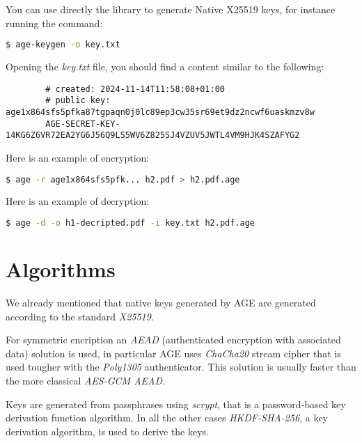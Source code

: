\documentclass{article}
\begin{document}
	\noindent You can use directly the library to generate Native X25519 keys, for instance running the command:
	\begin{lstlisting}[language=bash]
	$ age-keygen -o key.txt
	\end{lstlisting}
	
	\noindent Opening the \emph{key.txt} file, you should find a content similar to the following:
	\begin{small}
	\begin{verbatim}
		# created: 2024-11-14T11:58:08+01:00
		# public key: age1x864sfs5pfka87tgpaqn0j0lc89ep3cw35sr69et9dz2ncwf6uaskmzv8w
		AGE-SECRET-KEY-14KG6Z6VR72EA2YG6J56Q9LS5WV6Z825SJ4VZUV5JWTL4VM9HJK4SZAFYG2
	\end{verbatim}
	\end{small}
	
	\noindent Here is an example of encryption:
	\begin{small}
	\begin{lstlisting}[language=bash]
	$ age -r age1x864sfs5pfk... h2.pdf > h2.pdf.age
	\end{lstlisting}
	\end{small}
	
	\noindent Here is an example of decryption:
	\begin{small}
	\begin{lstlisting}[language=bash]
	$ age -d -o h1-decripted.pdf -i key.txt h2.pdf.age
	\end{lstlisting}
	\end{small}
	
	\section{Algorithms}
	
	We already mentioned that native keys generated by AGE are generated according to the standard \emph{X25519}.
	
	For symmetric encription an \emph{AEAD} (authenticated encryption with associated data) solution is used,
	in particular AGE uses \emph{ChaCha20} stream cipher that
	is used tougher with the \emph{Poly1305} authenticator.
	This solution is usually faster than the more classical  \emph{AES-GCM AEAD}.
	
	Keys are generated from passphrases using \emph{scrypt}, that is a password-based key derivation function algorithm.
	In all the other cases \emph{HKDF-SHA-256}, a key derivation algorithm, is used to derive the keys.
	
\end{document}
